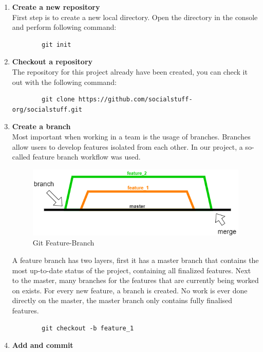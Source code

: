 \begin{enumerate}
    \item \textbf{Create a new repository} \\
    First step is to create a new local directory.
    Open the directory in the console and perform following command:
    \begin{lstlisting}
		git init
    \end{lstlisting}
    \item \textbf{Checkout a repository} \\
    The repository for this project already have been created, you can check it out with the following command:
    \begin{lstlisting}
		git clone https://github.com/socialstuff-org/socialstuff.git
    \end{lstlisting}
    \item \textbf{Create a branch} \\
    Most important when working in a team is the usage of branches.
    Branches allow users to develop features isolated from each other.
    In our project, a so-called feature branch workflow was used.
    \begin{figure}[h]
        \centering
        \includegraphics[width=1.0\textwidth]{./images/git_branching}
        \caption{Git Feature-Branch}
        \label{fig:gitbranching}
    \end{figure}
    A feature branch has two layers, first it has a master branch that contains the most up-to-date status of the
    project, containing all finalized features.
    Next to the master, many branches for the features that are currently being worked on exists.
    For every new feature, a branch is created.
    No work is ever done directly on the master, the master branch only contains fully finalised features.
    \begin{lstlisting}
		git checkout -b feature_1
    \end{lstlisting}
    \item \textbf{Add and commit} \\
    \begin{figure}[h]

\end{figure}
\end{enumerate}
